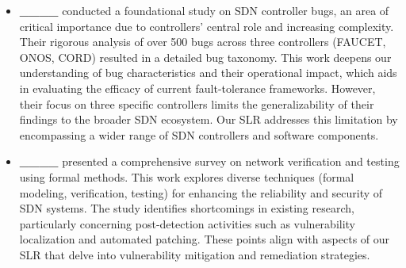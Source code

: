 \begin{itemize}
    \item \textbf{____} conducted a foundational study on SDN controller bugs, an area of critical importance due to controllers' central role and increasing complexity. Their rigorous analysis of over 500 bugs across three controllers (FAUCET, ONOS, CORD) resulted in a detailed bug taxonomy. This work deepens our understanding of bug characteristics and their operational impact, which aids in evaluating the efficacy of current fault-tolerance frameworks. However, their focus on three specific controllers limits the generalizability of their findings to the broader SDN ecosystem. Our SLR addresses this limitation by encompassing a wider range of SDN controllers and software components.

    \item \textbf{____} presented a comprehensive survey on network verification and testing using formal methods. This work explores diverse techniques (formal modeling, verification, testing) for enhancing the reliability and security of SDN systems. The study identifies shortcomings in existing research, particularly concerning post-detection activities such as vulnerability localization and automated patching. These points align with aspects of our SLR that delve into vulnerability mitigation and remediation strategies.
    

\end{itemize}

